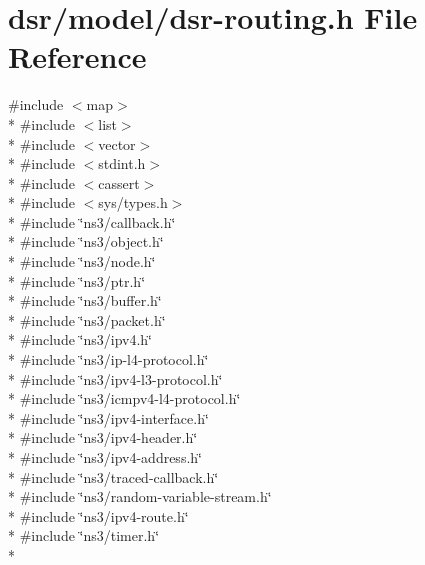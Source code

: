 \hypertarget{dsr-routing_8h}{}\section{dsr/model/dsr-\/routing.h File Reference}
\label{dsr-routing_8h}
{\ttfamily \#include $<$map$>$}\\*
{\ttfamily \#include $<$list$>$}\\*
{\ttfamily \#include $<$vector$>$}\\*
{\ttfamily \#include $<$stdint.\+h$>$}\\*
{\ttfamily \#include $<$cassert$>$}\\*
{\ttfamily \#include $<$sys/types.\+h$>$}\\*
{\ttfamily \#include \char`\"{}ns3/callback.\+h\char`\"{}}\\*
{\ttfamily \#include \char`\"{}ns3/object.\+h\char`\"{}}\\*
{\ttfamily \#include \char`\"{}ns3/node.\+h\char`\"{}}\\*
{\ttfamily \#include \char`\"{}ns3/ptr.\+h\char`\"{}}\\*
{\ttfamily \#include \char`\"{}ns3/buffer.\+h\char`\"{}}\\*
{\ttfamily \#include \char`\"{}ns3/packet.\+h\char`\"{}}\\*
{\ttfamily \#include \char`\"{}ns3/ipv4.\+h\char`\"{}}\\*
{\ttfamily \#include \char`\"{}ns3/ip-\/l4-\/protocol.\+h\char`\"{}}\\*
{\ttfamily \#include \char`\"{}ns3/ipv4-\/l3-\/protocol.\+h\char`\"{}}\\*
{\ttfamily \#include \char`\"{}ns3/icmpv4-\/l4-\/protocol.\+h\char`\"{}}\\*
{\ttfamily \#include \char`\"{}ns3/ipv4-\/interface.\+h\char`\"{}}\\*
{\ttfamily \#include \char`\"{}ns3/ipv4-\/header.\+h\char`\"{}}\\*
{\ttfamily \#include \char`\"{}ns3/ipv4-\/address.\+h\char`\"{}}\\*
{\ttfamily \#include \char`\"{}ns3/traced-\/callback.\+h\char`\"{}}\\*
{\ttfamily \#include \char`\"{}ns3/random-\/variable-\/stream.\+h\char`\"{}}\\*
{\ttfamily \#include \char`\"{}ns3/ipv4-\/route.\+h\char`\"{}}\\*
{\ttfamily \#include \char`\"{}ns3/timer.\+h\char`\"{}}\\*
